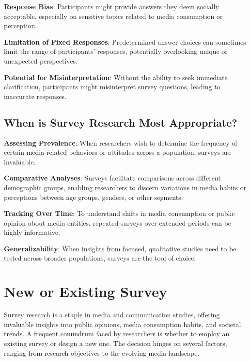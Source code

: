 \documentclass[
  b5paper]{book}
\begin{document}
\textbf{Response Bias}: Participants might provide answers they deem socially acceptable, especially on sensitive topics related to media consumption or perception.

\textbf{Limitation of Fixed Responses}: Predetermined answer choices can sometimes limit the range of participants' responses, potentially overlooking unique or unexpected perspectives.

\textbf{Potential for Misinterpretation}: Without the ability to seek immediate clarification, participants might misinterpret survey questions, leading to inaccurate responses.

\hypertarget{when-is-survey-research-most-appropriate}{%
\subsection*{When is Survey Research Most Appropriate?}\label{when-is-survey-research-most-appropriate}}

\textbf{Assessing Prevalence}: When researchers wish to determine the frequency of certain media-related behaviors or attitudes across a population, surveys are invaluable.

\textbf{Comparative Analyses}: Surveys facilitate comparisons across different demographic groups, enabling researchers to discern variations in media habits or perceptions between age groups, genders, or other segments.

\textbf{Tracking Over Time}: To understand shifts in media consumption or public opinion about media entities, repeated surveys over extended periods can be highly informative.

\textbf{Generalizability}: When insights from focused, qualitative studies need to be tested across broader populations, surveys are the tool of choice.

\hypertarget{new-or-existing-survey}{%
\section{New or Existing Survey}\label{new-or-existing-survey}}

Survey research is a staple in media and communication studies, offering invaluable insights into public opinions, media consumption habits, and societal trends.
A frequent conundrum faced by researchers is whether to employ an existing survey or design a new one.
The decision hinges on several factors, ranging from research objectives to the evolving media landscape.
\end{document}
